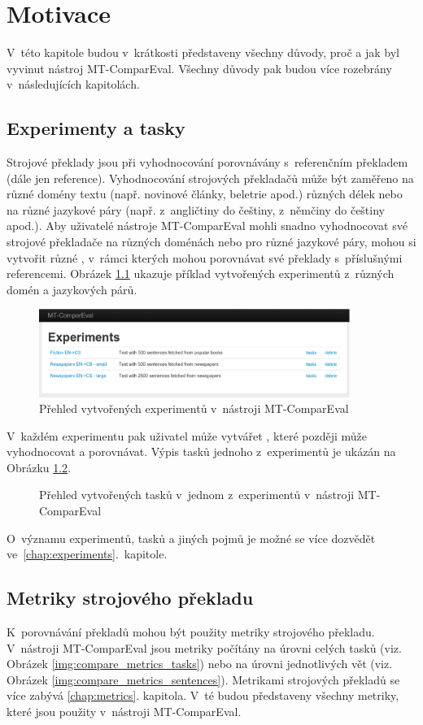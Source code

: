 \chapter{Motivace}
V~této kapitole budou v~krátkosti představeny všechny důvody,
  proč a jak byl vyvinut nástroj MT-ComparEval.
Všechny důvody pak budou více rozebrány v~následujících kapitolách.

\section{Experimenty a tasky}
Strojové překlady jsou při vyhodnocování porovnávány s~referenčním překladem
  (dále jen reference).
Vyhodnocování strojových překladačů může být zaměřeno na různé domény textu (např. novinové články, beletrie apod.) různých délek
  nebo na různé jazykové páry (např. z~angličtiny do češtiny, z~němčiny do češtiny apod.).
Aby uživatelé nástroje MT-ComparEval mohli snadno vyhodnocovat své strojové překladače na různých doménách nebo pro různé jazykové páry,
  mohou si vytvořit různé ,
  v~rámci kterých mohou porovnávat své překlady s~příslušnými referencemi.
Obrázek \ref{img:experiments} ukazuje příklad vytvořených experimentů z~různých domén a jazykových párů.
\begin{figure}
	\center
	\includegraphics[width=0.9\textwidth]{img/experiments.eps}

	\caption{Přehled vytvořených experimentů v~nástroji MT-ComparEval}
	\label{img:experiments}
\end{figure}

V~každém experimentu pak uživatel může vytvářet ,
  které později může vyhodnocovat a porovnávat.
Výpis tasků jednoho z~experimentů je ukázán na Obrázku \ref{img:tasks}.
\begin{figure}
	\caption{Přehled vytvořených tasků v~jednom z~experimentů v~nástroji MT-ComparEval}
	\label{img:tasks}
\end{figure}

O~významu experimentů, tasků a jiných pojmů je možné se více dozvědět ve~\ref{chap:experiments}.~kapitole.


\section{Metriky strojového překladu}
K~porovnávání překladů mohou být použity metriky strojového překladu.
V~nástroji MT-ComparEval jsou metriky počítány na úrovni celých tasků 
  (viz. Obrázek \ref{img:compare_metrics_tasks})
  nebo na úrovni jednotlivých vět
  (viz. Obrázek \ref{img:compare_metrics_sentences}).
Metrikami strojových překladů se více zabývá \ref{chap:metrics}. kapitola.
V~té budou představeny všechny metriky,
  které jsou použity v~nástroji MT-ComparEval.

